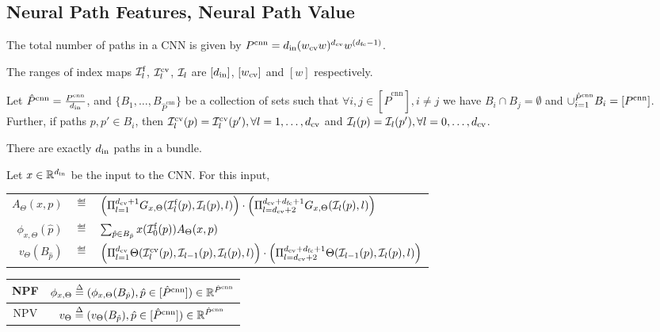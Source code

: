 \subsection{Neural Path Features, Neural Path Value}

\begin{proposition}
The total number of paths in a CNN is given by  $P^{\text{cnn}}=d_{\text{in}}(w_{\text{cv}} w)^{d_{\text{cv}}}w^{(d_{\text{fc}}-1)}$.
\end{proposition}

\begin{notation}
The ranges of index maps $\mathcal{I}^{\text{f}}_l$,  $\mathcal{I}^{\text{cv}}_l$, $\mathcal{I}_l$ are $[d_{\text{in}}]$, $[w_{\text{cv}}]$ and $[w]$ respectively. 
\end{notation}

\begin{definition}\label{def:bundle}
Let $\hat{P}^{\text{cnn}}=\frac{P^{\text{cnn}}}{d_{\text{in}}}$, and $\{B_1,\ldots, B_{\hat{P}^{\text{cnn}}}\}$ be a collection of sets such that $\forall i,j\in [\hat{P}^{\text{cnn}}], i\neq j$ we have $B_i\cap B_j=\emptyset$ and $\cup_{i=1}^{\hat{P}^{\text{cnn}}}B_i =[P^{\text{cnn}}]$. Further,  if paths $p,p' \in B_i$, then $\mathcal{I}^{\text{cv}}_l(p)=\mathcal{I}^{\text{cv}}_l(p'), \forall l=1,\ldots, d_{\text{cv}}$ and $\mathcal{I}_l(p)=\mathcal{I}_l(p'), \forall l=0,\ldots, d_{\text{cv}}$.
\end{definition}

\begin{proposition}\label{prop:bundle}
There are exactly $d_{\text{in}}$ paths in a bundle.
\end{proposition}

\begin{definition}\label{def:convnps} Let $x\in\mathbb{R}^{d_{\text{in}}}$ be the input to the CNN. For this input, 
\begin{tabular}{rlp{12cm}}
$A_{\Theta}(x,p)$&$\eqdef$&$\left(\Pi_{l=1}^{d_{\text{cv}}+1} G_{x,\Theta}(\mathcal{I}^{\text{f}}_l(p),\mathcal{I}_l(p),l)\right)\cdot\left(\Pi_{l=d_{\text{cv}}+2}^{d_{\text{cv}}+d_{\text{fc}}+1} G_{x,\Theta}(\mathcal{I}_l(p),l)\right)$\\
$\phi_{x,\Theta}(\hat{p})$&$\eqdef$&$ \sum_{\hat{p}\in B_{\hat{p}}}x(\mathcal{I}^{\text{f}}_0(p))A_{\Theta}(x,p)$\\
$v_{\Theta}(B_{\hat{p}})$&$\eqdef$&$ \left(\Pi_{l=1}^{d_{\text{cv}}} \Theta(\mathcal{I}^{\text{cv}}_{l}(p),\mathcal{I}_{l-1}(p),\mathcal{I}_{l}(p),l)\right) \cdot\left( \Pi_{l=d_{\text{cv}}+2}^{d_{\text{cv}}+d_{\text{fc}}+1} \Theta(\mathcal{I}_{l-1}(p),\mathcal{I}_l(p),l)\right)$ 
\end{tabular}
\begin{center}
\begin{tabular}{|c|c|}\hline
NPF &$\phi_{x,\Theta}\stackrel{\Delta}{=} (\phi_{x,\Theta}(B_{\hat{p}}),\hat{p}\in [\hat{P}^{\text{cnn}}])\in\mathbb{R}^{\hat{P}^{\text{cnn}}}$\\\hline
NPV& $v_{\Theta}\stackrel{\Delta}{=} (v_{\Theta}(B_{\hat{p}}),\hat{p}\in [\hat{P}^{\text{cnn}}])\in\mathbb{R}^{\hat{P}^{\text{cnn}}}$\\\hline
\end{tabular}
\end{center}
\end{definition}



